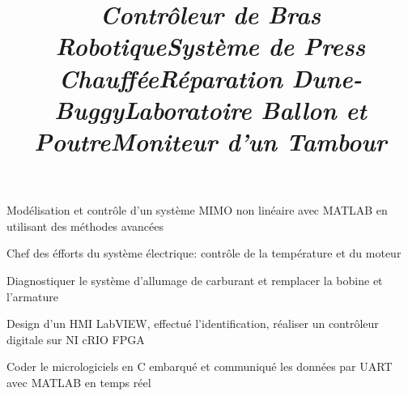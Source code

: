 \documentclass[mm]{res}
\begin{document}
\begin{resume}
\title{\textsl{Contr\^oleur de Bras Robotique}}
\begin{position}
\tb Mod\'elisation et contr\^ole d'un syst\`eme MIMO non lin\'eaire avec MATLAB en utilisant des m\'ethodes avanc\'ees
\end{position}

\title{\textsl{Syst\`eme de Press Chauff\'ee}}
\begin{position}
\tb Chef des \'efforts du syst\`eme \'electrique: contr\^ole de la temp\'erature et du moteur 
\end{position}



\title{\textsl{R\'eparation Dune-Buggy}}
\begin{position}
\tb Diagnostiquer le syst\`eme d'allumage de carburant et remplacer la bobine et l'armature
\end{position}

\title{\textsl{Laboratoire Ballon et Poutre}}
\begin{position}
\tb Design d'un HMI LabVIEW, effectu\'e l'identification, r\'ealiser un contr\^oleur digitale sur NI cRIO FPGA
\end{position}

\title{\textsl{Moniteur d'un Tambour}}
\begin{position}
\tb Coder le micrologiciels en C embarqu\'e et communiqu\'e les donn\'ees par UART avec MATLAB en temps r\'eel
\end{position}


\end{resume}
\end{document}
